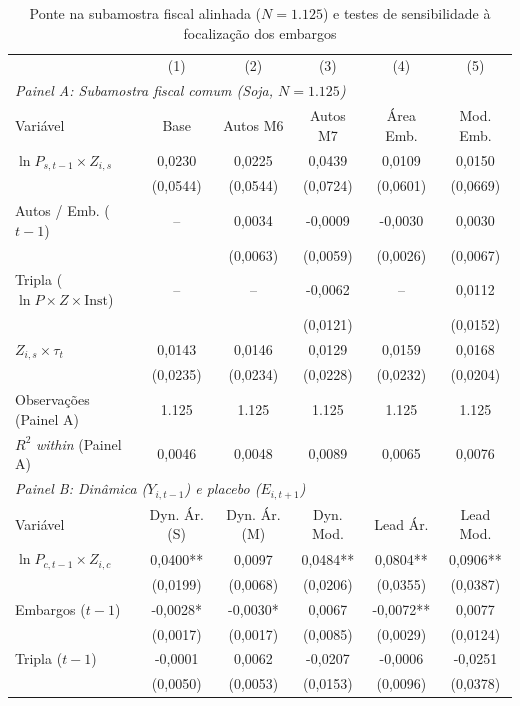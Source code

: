 \begin{table}[htbp]
\centering
\footnotesize
\setlength{\tabcolsep}{2.4pt}
\captionstyle{\centering}
\normalcaption
\caption{Ponte na subamostra fiscal alinhada ($N=1.125$) e testes de sensibilidade à focalização dos embargos}
\label{tab:ap-h1b-sens}
\begin{tabular}{lccccc}
\toprule
 & (1) & (2) & (3) & (4) & (5) \\
\multicolumn{6}{l}{\textit{Painel A: Subamostra fiscal comum (Soja, $N = 1.125$)}} \\
Variável & Base & Autos M6 & Autos M7 & Área Emb. & Mod. Emb. \\
\midrule
$\ln P_{s,t-1} \times Z_{i,s}$ & 0,0230 & 0,0225 & 0,0439 & 0,0109 & 0,0150 \\
 & (0,0544) & (0,0544) & (0,0724) & (0,0601) & (0,0669) \\
Autos / Emb. ($t-1$) & -- & 0,0034 & -0,0009 & -0,0030 & 0,0030 \\
 &  & (0,0063) & (0,0059) & (0,0026) & (0,0067) \\
Tripla ($\ln P \times Z \times \text{Inst}$) & -- & -- & -0,0062 & -- & 0,0112 \\
 &  &  & (0,0121) &  & (0,0152) \\
$Z_{i,s} \times \tau_t$ & 0,0143 & 0,0146 & 0,0129 & 0,0159 & 0,0168 \\
 & (0,0235) & (0,0234) & (0,0228) & (0,0232) & (0,0204) \\
Observações (Painel A) & 1.125 & 1.125 & 1.125 & 1.125 & 1.125 \\
$R^2$ \textit{within} (Painel A) & 0,0046 & 0,0048 & 0,0089 & 0,0065 & 0,0076 \\
\midrule
\multicolumn{6}{l}{\textit{Painel B: Dinâmica ($Y_{i,t-1}$) e placebo ($E_{i,t+1}$)}} \\
Variável & Dyn. Ár. (S) & Dyn. Ár. (M) & Dyn. Mod. & Lead Ár. & Lead Mod. \\
\midrule
$\ln P_{c,t-1} \times Z_{i,c}$ & 0,0400** & 0,0097 & 0,0484** & 0,0804** & 0,0906** \\
 & (0,0199) & (0,0068) & (0,0206) & (0,0355) & (0,0387) \\
Embargos ($t-1$) & -0,0028* & -0,0030* & 0,0067 & -0,0072** & 0,0077 \\
 & (0,0017) & (0,0017) & (0,0085) & (0,0029) & (0,0124) \\
Tripla ($t-1$) & -0,0001 & 0,0062 & -0,0207 & -0,0006 & -0,0251 \\
 & (0,0050) & (0,0053) & (0,0153) & (0,0096) & (0,0378) \\

\end{tabular}
\end{table}
